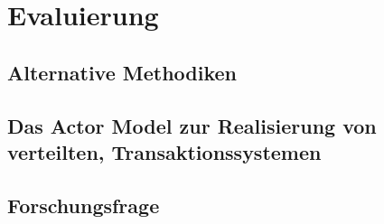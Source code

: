 




\chapter{Evaluierung}
\section{Alternative Methodiken}
\section{Das Actor Model zur Realisierung von verteilten, Transaktionssystemen} 
\section{Forschungsfrage} 